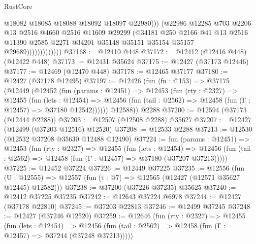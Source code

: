 \begin{lexlean}{RustCore}
\begin{coremodule}
                                @18082
                                @18085
                                @18088
                                @18092
                                @18097
                                @22980)))
                          (@22986
                            @12285
                            @703
                            @2206
                            @13
                            @2516
                            @4660
                            @2516
                            @11609
                            @29299
                            (@34181
                              @250
                              @2166
                              @41
                              @13
                              @2516
                              @11390
                              @2585
                              @2271
                              @34201
                              @35148
                              @35151
                              @35154
                              @35157
                              @29689)))))))))))))
@37168 := @12410 @448
@37172 := @12412 (@12416 @448) (@12422 @448)
@37173 := @12431 @35624
@37175 := @12427 (@37173 @12446)
@37177 := @12469 (@12470 @448)
@37178 := @12465 @37177
@37180 := @12427 (@37178 @12495)
@37197 := @12426
    (fun (fn : @153) =>
    @37175
      (@12449
        (@12452
          (fun (params : @12451) =>
          @12453
            (fun (rty : @2327) =>
            @12455
              (fun (lets : @12454) =>
              @12456 (fun (tail : @2562) => @12458 (fun (Γ : @12457) => @37180 @12542))))))
        @12588))
    @2288
@37200 := @12594 (@37173 (@12444 @2288))
@37203 := @12507 (@12508 @2288) @35627
@37207 := @12427 (@12499 (@37203 @12516) @12520)
@37208 := @12533 @2288
@37213 := @12530 (@12532 @37208 @35630 @12488 @12490)
@37224 := fun (params : @12451) =>
  @12453
    (fun (rty : @2327) =>
    @12455
      (fun (lets : @12454) =>
      @12456 (fun (tail : @2562) => @12458 (fun (Γ : @12457) => @37180 (@37207 @37213)))))
@37225 := @12452 @37224
@37226 := @12449 @37225
@37235 := @12556
    (fun (U : @12555) => @12557 (fun (t : @7) => @12565 (@12427 (@12571 @35627 @12445) @12582)))
@37238 := @37200 (@37226 @37235) @35625
@37240 := @12412 @37225 @37235
@37242 := @12643 @37224 @6978
@37244 := @12427 (@37178 @22810)
@37245 := @37203 @22813
@37246 := @12499 @37245
@37248 := @12427 (@37246 @12520)
@37259 := @12646
    (fun (rty : @2327) =>
    @12455
      (fun (lets : @12454) =>
      @12456 (fun (tail : @2562) => @12458 (fun (Γ : @12457) => @37244 (@37248 @37213)))))

\end{coremodule}
\end{lexlean}
